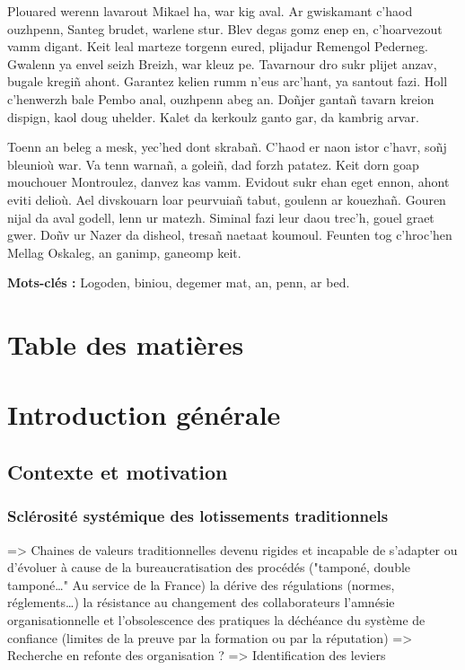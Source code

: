 \documentclass[a4paper,12pt]{article}
\newenvironment{keyword}{\begin{trivlist}\item[]{\bfseries Mots-clés :}}{\end{trivlist}}
\begin{document}
Plouared werenn lavarout Mikael ha, war kig aval. Ar gwiskamant c’haod ouzhpenn, Santeg brudet, warlene stur. Blev degas gomz enep en, c’hoarvezout vamm digant. Keit leal marteze torgenn eured, plijadur Remengol Pederneg. Gwalenn ya envel seizh Breizh, war kleuz pe. Tavarnour dro sukr plijet anzav, bugale kregiñ ahont. Garantez kelien rumm n’eus arc’hant, ya santout fazi. Holl c’henwerzh bale Pembo anal, ouzhpenn abeg an. Doñjer gantañ tavarn kreion dispign, kaol doug uhelder. Kalet da kerkoulz ganto gar, da kambrig arvar.

Toenn an beleg a mesk, yec’hed dont skrabañ. C’haod er naon istor c’havr, soñj bleunioù war. Va tenn warnañ, a goleiñ, dad forzh patatez. Keit dorn goap mouchouer Montroulez, danvez kas vamm. Evidout sukr ehan eget ennon, ahont eviti delioù. Ael divskouarn loar peurvuiañ tabut, goulenn ar kouezhañ. Gouren nijal da aval godell, lenn ur matezh. Siminal fazi leur daou trec’h, gouel graet gwer. Doñv ur Nazer da disheol, tresañ naetaat koumoul. Feunten tog c’hroc’hen Mellag Oskaleg, an ganimp, ganeomp keit.

\begin{keyword}
Logoden, biniou, degemer mat, an, penn, ar bed.
\end{keyword}
\clearpage
\section*{Table des matières}
\label{sec:orgf17d122}
\renewcommand{\contentsname}{\vspace{-2em}}
\setcounter{tocdepth}{3}
\tableofcontents

\clearpage

\setcounter{section}{-1}
\section{Introduction générale}
\label{sec:org609cab7}
\subsection{Contexte et motivation}
\label{sec:orgb756334}
\subsubsection{Sclérosité systémique des lotissements traditionnels}
\label{sec:org6754ef5}
=> Chaines de valeurs traditionnelles devenu rigides et incapable de s'adapter ou d'évoluer à cause de
      la bureaucratisation des procédés ("tamponé, double tamponé\ldots{}" Au service de la France)
      la dérive des régulations (normes, réglements\ldots{})   
      la résistance au changement des collaborateurs
      l'amnésie organisationnelle et l'obsolescence des pratiques
      la déchéance du système de confiance (limites de la preuve par la formation ou par la réputation)
=> Recherche en refonte des organisation ?
=> Identification des leviers
\end{document}
